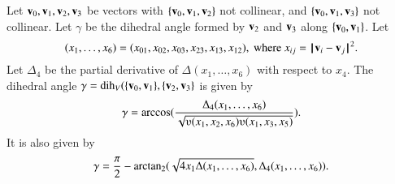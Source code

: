 \begin{lemma}[]\label{lemma:dihform}
Let ${\mathbf v}_0,{\mathbf v}_1,{\mathbf v}_2,{\mathbf v}_3$ 
be vectors with $\{{\mathbf v}_0,{\mathbf v}_1,{\mathbf v}_2\}$ not collinear, 
and $\{{\mathbf v}_0,{\mathbf v}_1,{\mathbf v}_3\}$ not
collinear. 
Let $\gamma$ be the dihedral angle formed
by ${\mathbf v}_2$ and ${\mathbf v}_3$ along $\{{\mathbf v}_0,{\mathbf v}_1\}$. Let
\begin{displaymath}(x_1,\ldots,x_6) = 
(x_{01},x_{02},x_{03},x_{23},x_{13},x_{12}),
\text{ where } x_{ij}=\norm{\v_i}{\v_j}^2.\end{displaymath}
Let $\Delta_4$ be the partial derivative of $\Delta(x_1,\ldots,x_6)$ with
respect to $x_4$.
The dihedral angle $\gamma=\operatorname{dih}_V(\{{\mathbf v}_0,{\mathbf v}_1\},\{{\mathbf v}_2,{\mathbf v}_3\}$
is given by
\begin{displaymath}
\gamma=\arccos(\frac{\Delta_4(x_1,\ldots,x_6)}{\sqrt{
\ups(x_1,x_2,x_6)\ups(x_1,x_3,x_5)}}).
\end{displaymath}
It is also given by
\begin{displaymath}
\gamma=\frac{\pi}{2} - {\operatorname{arctan_2}}
({\sqrt{4 x_1 \Delta(x_1,\ldots,x_6)}},{\Delta_4(x_1,\ldots,x_6)}).
\end{displaymath}
\end{lemma}
%


